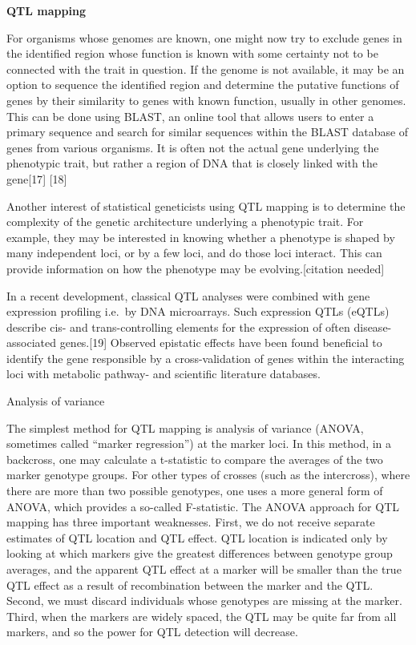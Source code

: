 \textbf{QTL mapping}

For organisms whose genomes are known, one might now try to exclude genes in the identified region whose function is known with some certainty not to be connected with the trait in question. If the genome is not available, it may be an option to sequence the identified region and determine the putative functions of genes by their similarity to genes with known function, usually in other genomes. This can be done using BLAST, an online tool that allows users to enter a primary sequence and search for similar sequences within the BLAST database of genes from various organisms. It is often not the actual gene underlying the phenotypic trait, but rather a region of DNA that is closely linked with the gene{[}17{]} {[}18{]}

Another interest of statistical geneticists using QTL mapping is to determine the complexity of the genetic architecture underlying a phenotypic trait. For example, they may be interested in knowing whether a phenotype is shaped by many independent loci, or by a few loci, and do those loci interact. This can provide information on how the phenotype may be evolving.{[}citation needed{]}

In a recent development, classical QTL analyses were combined with gene expression profiling i.e.~by DNA microarrays. Such expression QTLs (eQTLs) describe cis- and trans-controlling elements for the expression of often disease-associated genes.{[}19{]} Observed epistatic effects have been found beneficial to identify the gene responsible by a cross-validation of genes within the interacting loci with metabolic pathway- and scientific literature databases.

Analysis of variance

The simplest method for QTL mapping is analysis of variance (ANOVA, sometimes called ``marker regression'') at the marker loci. In this method, in a backcross, one may calculate a t-statistic to compare the averages of the two marker genotype groups. For other types of crosses (such as the intercross), where there are more than two possible genotypes, one uses a more general form of ANOVA, which provides a so-called F-statistic. The ANOVA approach for QTL mapping has three important weaknesses. First, we do not receive separate estimates of QTL location and QTL effect. QTL location is indicated only by looking at which markers give the greatest differences between genotype group averages, and the apparent QTL effect at a marker will be smaller than the true QTL effect as a result of recombination between the marker and the QTL. Second, we must discard individuals whose genotypes are missing at the marker. Third, when the markers are widely spaced, the QTL may be quite far from all markers, and so the power for QTL detection will decrease.

